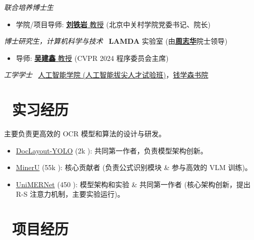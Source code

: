 \documentclass[10pt]{resume}
\begin{document}
\textit{联合培养博士生}
\small{
\begin{itemize}[parsep=0.5ex]
    \item 学院/项目导师: \href{https://bjzgca.edu.cn/teacher/e4bebfc09b254c6f8db87ceacea3b4d2?type=lead}{\textbf{刘铁岩} 教授} (北京中关村学院党委书记、院长)
\end{itemize}
}

\textit{博士研究生，计算机科学与技术} \, \textbf{LAMDA} 实验室 (由\href{https://cs.nju.edu.cn/zhouzh/index.htm}{\textbf{周志华}}院士领导)
\small{
\begin{itemize}[parsep=0.5ex]
    \item 导师: \href{https://cs.nju.edu.cn/wujx/index.htm}{\textbf{吴建鑫} 教授} (CVPR 2024 程序委员会主席)
\end{itemize}
}

\textit{工学学士} \, \href{https://iair.xjtu.edu.cn/index.htm}{人工智能学院 (人工智能拔尖人才试验班)}，\href{https://www.xjtu.edu.cn/qxs_sy.htm}{钱学森书院}


\section{\faSuitcase\ 实习经历}
\small{
主要负责更高效的 OCR 模型和算法的设计与研发。
\begin{itemize}[leftmargin=*, parsep=0.5ex]
    \item \href{https://github.com/opendatalab/DocLayout-YOLO}{DocLayout-YOLO} (2k \faStar): 共同第一作者，负责模型架构创新。
    \item \href{https://github.com/opendatalab/MinerU}{MinerU} (55k \faStar): 核心贡献者 (负责公式识别模块 \& 参与高效的 VLM 训练)。
    \item \href{https://github.com/opendatalab/UniMERNet}{UniMERNet} (450 \faStar): 模型架构和实验 \& 共同第一作者 (核心架构创新，提出 R-S 注意力机制，主要实验运行)。
\end{itemize}
}


\section{\faSuitcase\ 项目经历}
\end{document}
